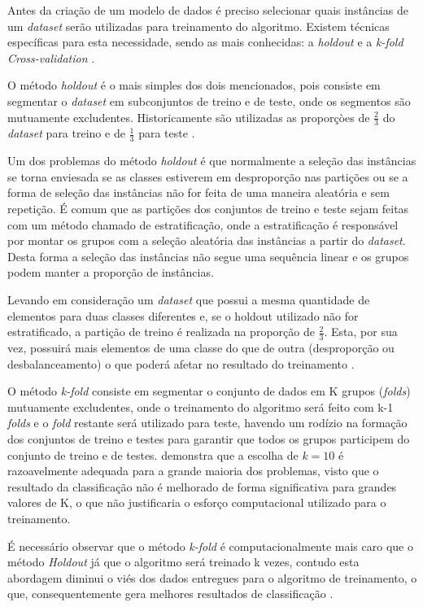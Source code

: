 Antes da criação de um modelo de dados é preciso selecionar quais instâncias de um \emph{dataset} serão utilizadas para treinamento do algoritmo. Existem técnicas específicas para esta necessidade, sendo as mais conhecidas: a \emph{holdout} e a \emph{k-fold Cross-validation} \cite{Kohavi1995}.

O método \emph{holdout} é o mais simples dos dois mencionados, pois consiste em segmentar o \emph{dataset} em subconjuntos de treino e de teste, onde os segmentos são mutuamente excludentes. Historicamente são utilizadas as proporçòes de $\frac{2}{3}$ do \emph{dataset} para treino e de $\frac{1}{3}$ para teste \cite{Kohavi1995}.

Um dos problemas do método \emph{holdout} é que normalmente a seleção das instâncias se torna enviesada se as classes estiverem em desproporção nas partições ou se a forma de seleção das instâncias não for feita de uma maneira aleatória e sem repetição. É comum que as partições dos conjuntos de treino e teste sejam feitas com um método chamado de estratificação, onde a estratificação é responsável por montar os grupos com a seleção aleatória das instâncias a partir do \textit{dataset}. Desta forma a seleção das instâncias não segue uma sequência linear e os grupos podem manter a proporção de instâncias.

Levando em consideração um \emph{dataset} que possui a mesma quantidade de elementos para duas classes diferentes e, se o holdout utilizado não for estratificado, a partição de treino é realizada na proporção de $\frac{2}{3}$. Esta, por sua vez, possuirá mais elementos de uma classe do que de outra (desproporção ou desbalanceamento) o que poderá afetar no resultado do treinamento \cite{Witten2016}.

O método \emph{k-fold} consiste em segmentar o conjunto de dados em K grupos (\emph{folds}) mutuamente excludentes, onde o treinamento do algoritmo será feito com k-1 \emph{folds} e o \emph{fold} restante será utilizado para teste, havendo um rodízio na formação dos conjuntos de treino e testes para garantir que todos os grupos participem do conjunto de treino e de testes.  demonstra que a escolha de $k = 10$ é razoavelmente adequada para a grande maioria dos problemas, visto que o resultado da classificação não é melhorado de forma significativa para grandes valores de K, o que não justificaria o esforço computacional utilizado para o treinamento.

É necessário observar que o método \emph{k-fold} é computacionalmente mais caro que o método \emph{Holdout} já que o algoritmo será treinado k vezes, contudo esta abordagem diminui o viés dos dados entregues para o algoritmo de treinamento, o que, consequentemente gera melhores resultados de classificação .


